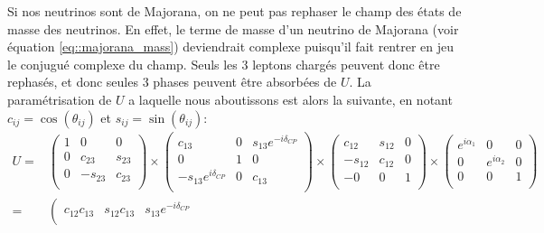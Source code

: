             Si nos neutrinos sont de Majorana, on ne peut pas rephaser le champ des états de masse des neutrinos. En effet, le terme de masse d'un neutrino de Majorana (voir équation \eqref{eq::majorana_mass}) deviendrait complexe puisqu'il fait rentrer en jeu le conjugué complexe du champ. Seuls les 3 leptons chargés peuvent donc être rephasés, et donc seules 3 phases peuvent être absorbées de $U$. La paramétrisation de $U$ a laquelle nous aboutissons est alors la suivante, en notant $c_{ij}=\cos(\theta_{ij})$ et $s_{ij}=\sin(\theta_{ij})$: 
            \begin{eqnarray}
                U= & 
                \left(\begin{matrix}
                        1   &    0    &    0   \\
                        0   & c_{23}  & s_{23} \\
                        0   & -s_{23} & c_{23} \\
                \end{matrix}\right)\times
                \left(\begin{matrix}
                    c_{13}  &    0    & s_{13}e^{-i\delta_{CP}} \\
                        0   &    1    &    0   \\
    -s_{13}e^{i\delta_{CP}} &    0    & c_{13} \\
                \end{matrix}\right)\times
                \left(\begin{matrix}
                    c_{12}  & s_{12}  &    0   \\
                    -s_{12} & c_{12}  &    0   \\
   -                    0   &    0    &    1   \\
                \end{matrix}\right)\times
                \left(\begin{matrix}
              e^{i\alpha_1} &    0    &    0   \\
                        0   & e^{i\alpha_2} & 0 \\
                        0   & 0 & 1 \\
                \end{matrix}\right) \\\label{eq::pmns}
                =& 
                \left(\begin{matrix}
c_{12}c_{13}                                    & s_{12}c_{13}                                    & s_{13}e^{-i\delta_{CP}} \\

\end{matrix}
\end{eqnarray}
